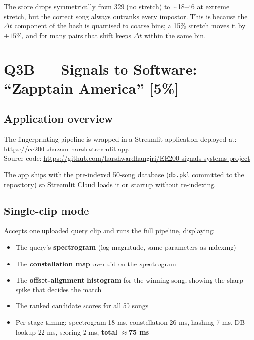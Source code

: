 \documentclass[11pt,a4paper]{article}
\begin{document}
The score drops symmetrically from 329 (no stretch) to $\sim$18–46 at extreme
stretch, but the correct song always outranks every impostor. This is because the
$\Delta t$ component of the hash is quantised to coarse bins; a 15\% stretch moves
it by $\pm 15\%$, and for many pairs that shift keeps $\Delta t$ within the same bin.

\section{Q3B — Signals to Software: ``Zapptain America'' [5\%]}

\subsection{Application overview}

The fingerprinting pipeline is wrapped in a Streamlit application deployed at:\\
\url{https://ee200-shazam-harsh.streamlit.app}\\
Source code: \url{https://github.com/harshwardhangiri/EE200-signals-systems-project}

The app ships with the pre-indexed 50-song database (\texttt{db.pkl} committed
to the repository) so Streamlit Cloud loads it on startup without re-indexing.

\subsection{Single-clip mode}

Accepts one uploaded query clip and runs the full pipeline, displaying:
\begin{itemize}[noitemsep]
  \item The query's \textbf{spectrogram} (log-magnitude, same parameters as indexing)
  \item The \textbf{constellation map} overlaid on the spectrogram
  \item The \textbf{offset-alignment histogram} for the winning song, showing the
        sharp spike that decides the match
  \item The ranked candidate scores for all 50 songs
  \item Per-stage timing: spectrogram 18 ms, constellation 26 ms, hashing 7 ms,
        DB lookup 22 ms, scoring 2 ms, \textbf{total $\approx$75 ms}
\end{itemize}
\end{document}
